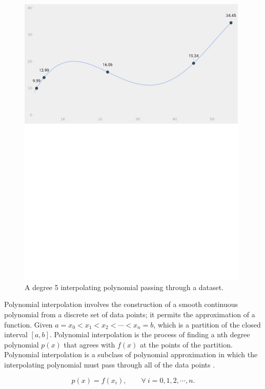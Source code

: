 \documentclass[11pt]{article}%
\begin{document}
\vspace{25pt}
\begin{figure}[htp]

\centering
\vspace{-20pt} %
\includegraphics[width=11cm]{interpolate1}%
\vspace{-220pt}
\caption{A degree 5 interpolating polynomial passing through a dataset.}

\end{figure}

Polynomial interpolation involves the construction of a smooth continuous polynomial from a discrete set of data points; it permits the approximation of a function. Given $a = x_0 < x_1 < x_2 < \cdots < x_n = b$, which is a partition of the closed interval $[a, b]$. Polynomial interpolation is the process of finding a nth degree polynomial $p(x)$ that agrees with $f(x)$ at the points of the partition. Polynomial interpolation is a subclass of polynomial approximation in which the interpolating polynomial must pass through all of the data points \cite{LHK3}.

\begin{equation}
p\left(x\right) = f(x_i), \qquad \forall \ i = 0, 1,2, \cdots,n.
\end{equation}
\end{document}
